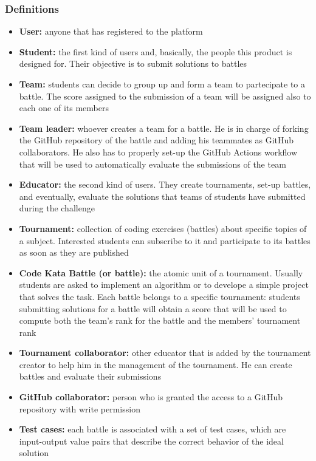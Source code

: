 \subsubsection{Definitions}
\begin{itemize}
    \item {\textbf{User:} anyone that has registered to the platform}
    \item {\textbf{Student:} the first kind of users and, basically, the people this product is designed for. Their objective is to submit solutions to battles}
    \item {\textbf{Team:} students can decide to group up and form a team to partecipate to a battle. The score assigned to the submission of a team will be assigned also to each one of its members}
    \item {\textbf{Team leader:} whoever creates a team for a battle. He is in charge of forking the GitHub repository of the battle and adding his teammates as GitHub collaborators. He also has to properly set-up the GitHub Actions workflow that will be used to automatically evaluate the submissions of the team}
    \item {\textbf{Educator:} the second kind of users. They create tournaments, set-up battles, and eventually, evaluate the solutions that teams of students have submitted during the challenge}
    \item {\textbf{Tournament:} collection of coding exercises (battles) about specific topics of a subject. Interested students can subscribe to it and participate to its battles as soon as they are published}
    \item {\textbf{Code Kata Battle (or battle):} the atomic unit of a tournament. Usually students are asked to implement an algorithm or to develope a simple project that solves the task. Each battle belongs to a specific tournament: students submitting solutions for a battle will obtain a score that will be used to compute both the team's rank for the battle and the members' tournament rank}
    \item {\textbf{Tournament collaborator:} other educator that is added by the tournament creator to help him in the management of the tournament. He can create battles and evaluate their submissions}
    \item {\textbf{GitHub collaborator:} person who is granted the access to a GitHub repository with write permission}
    \item {\textbf{Test cases:} each battle is associated with a set of test cases, which  are input-output value pairs that describe the correct behavior of the ideal solution}

\end{itemize}
